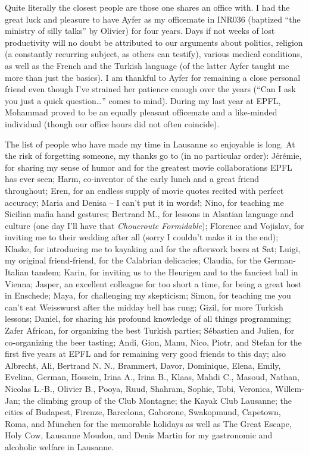 Quite literally the closest people are those one shares an office with. I had
the great luck and pleasure to have Ayfer as my officemate in INR036 (baptized
``the ministry of silly talks'' by Olivier) for four years. Days if not weeks of
lost productivity will no doubt be attributed to our arguments about politics,
religion (a constantly recurring subject, as others can testify), various
medical conditions, as well as the French and the Turkish language (of the
latter Ayfer taught me more than just the basics). I am thankful to Ayfer for
remaining a close personal friend even though I've strained her patience enough
over the years (``Can I ask you just a quick question\dots'' comes to mind).
During my last year at EPFL, Mohammad proved to be an equally pleasant
officemate and a like-minded individual (though our office hours did not often
coincide). 

The list of people who have made my time in Lausanne so enjoyable is long. At
the risk of forgetting someone, my thanks go to (in no particular order):
Jérémie, for sharing my sense of humor and for the greatest movie collaborations
EPFL has ever seen; Harm, co-inventor of the early lunch and a great friend
throughout; Eren, for an endless supply of movie quotes recited with perfect
accuracy; Maria and Denisa -- I can't put it in words!; Nino, for teaching me
Sicilian mafia hand gestures; Bertrand M., for lessons in Alsatian language and
culture (one day I'll have that \emph{Choucroute Formidable}); Florence and
Vojislav, for inviting me to their wedding after all (sorry I couldn't make it
in the end); Klaske, for introducing me to kayaking and for the afterwork beers
at Sat; Luigi, my original friend-friend, for the Calabrian delicacies; Claudia,
for the German-Italian tandem; Karin, for inviting us to the Heurigen and to the
fanciest ball in Vienna; Jasper, an excellent colleague for too short a time,
for being a great host in Enschede; Maya, for challenging my skepticism; Simon,
for teaching me you can't eat Weisswurst after the midday bell has rung; Gizil,
for more Turkish lessons; Daniel, for sharing his profound knowledge of all
things programming; Zafer African, for organizing the best Turkish parties;
Sébastien and Julien, for co-organizing the beer tasting; Andi, Gion, Manu,
Nico, Piotr, and Stefan for the first five years at EPFL and for remaining very
good friends to this day; also Albrecht, Ali, Bertrand N. N., Brammert, Davor,
Dominique, Elena, Emily, Evelina, German, Hossein, Irina A., Irina B., Klaas,
Mahdi C., Masoud, Nathan, Nicolas L.-B., Olivier B., Pooya, Ruud, Shahram,
Sophie, Tobi, Veronica, Willem-Jan; the climbing group of the Club Montagne; the
Kayak Club Lausanne; the cities of Budapest, Firenze, Barcelona, Gaborone,
Swakopmund, Capetown, Roma, and München for the memorable holidays as well as
The Great Escape, Holy Cow, Lausanne Moudon, and Denis Martin for my gastronomic
and alcoholic welfare in Lausanne. 

